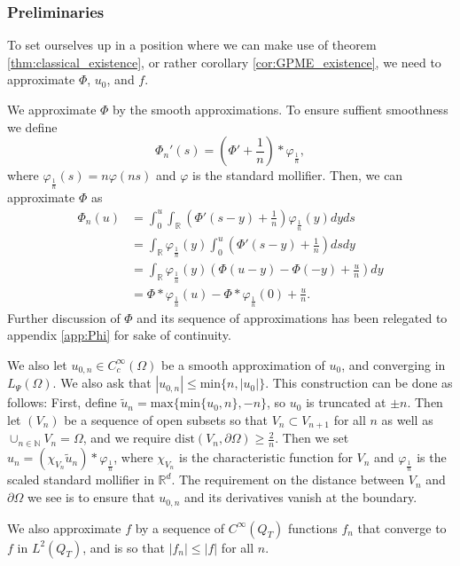 \documentclass[11pt, a4paper]{article}
\begin{document}
\subsubsection{Preliminaries}
To set ourselves up in a position where we can make use of theorem \ref{thm:classical_existence}, or rather corollary \ref{cor:GPME_existence}, we need to approximate $\Phi$, $u_0$, and $f$.

We approximate $\Phi$ by the smooth approximations. To ensure suffient smoothness we define
\begin{equation*}
\Phi_n'(s) = \left( \Phi' + \frac{1}{n}\right)*\varphi_{\frac{1}{n}},
\end{equation*}
where $\varphi_{\frac{1}{n}}(s) = n\varphi(ns)$ and $\varphi$ is the standard mollifier. Then, we can approximate $\Phi$ as
\begin{align*}
\Phi_n(u) &= \int_0^u \int_\mathbb{R}\left( \Phi'(s-y) + \frac{1}{n}\right)\varphi_{\frac{1}{n}}(y)dyds \\
&= \int_\mathbb{R}\varphi_{\frac{1}{n}}(y) \int_0^u \left( \Phi'(s-y) + \frac{1}{n}\right)dsdy \\
&= \int_\mathbb{R}\varphi_{\frac{1}{n}}(y) \left( \Phi(u-y) - \Phi(-y) + \frac{u}{n}\right)dy \\
&= \Phi * \varphi_{\frac{1}{n}}(u) - \Phi * \varphi_{\frac{1}{n}}(0) + \frac{u}{n}.
\end{align*}
Further discussion of $\Phi$ and its sequence of approximations has been relegated to appendix \ref{app:Phi} for sake of continuity.




We also let $u_{0,n}\in C^\infty_c(\Omega)$ be a smooth approximation of $u_0$, and converging in $L_\Psi(\Omega)$. We also ask that $|u_{0,n}| \leq \mathrm{min}\{n,|u_0|\}$.
This construction can be done as follows: First, define $\tilde{u}_n = \mathrm{max}\{ \mathrm{min}\{u_0, n\}, -n\}$, so $u_0$ is truncated at $\pm n$. Then let $(V_n)$ be a sequence of open subsets so that $V_n \subset V_{n+1}$ for all $n$ as well as $\cup_{n\in \mathbb{N}}V_n = \Omega$, and we require $\mathrm{dist}(V_n,\partial \Omega) \geq \frac{2}{n}$. Then we set $u_n = (\chi_{V_n}\tilde{u}_n)*\varphi_{\frac{1}{n}}$, where $\chi_{V_n}$ is the characteristic function for $V_n$ and $\varphi_{\frac{1}{n}}$ is the scaled standard mollifier in $\mathbb{R}^d$. The requirement on the distance between $V_n$ and $\partial \Omega$ we see is to ensure that $u_{0,n}$ and its derivatives vanish at the boundary. 

We also approximate $f$ by a sequence of $C^\infty(Q_T)$ functions $f_n$ that converge to $f$ in $L^2(Q_T)$, and is so that $|f_n| \leq |f|$ for all $n$.
\end{document}
